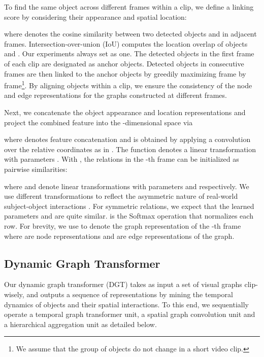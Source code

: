 \documentclass[runningheads]{llncs}
\begin{document}
To find the same object across different frames within a clip, we define a linking score  by considering their appearance and spatial location:

where  denotes the cosine similarity between two detected objects  and  in adjacent frames.  Intersection-over-union (IoU) computes the location overlap of objects  and . Our experiments always set   as one. The  detected objects in the first frame of each clip are designated as anchor objects. Detected objects in consecutive frames are then linked to the anchor objects by greedily maximizing  frame by frame\footnote{We assume that the group of objects do not change in a short video clip.}. By aligning objects within a clip, we ensure the consistency of the node and edge representations for the graphs constructed at different frames.

Next, we concatenate the object appearance  and location  representations and project the combined feature into the -dimensional space via

where  denotes feature concatenation and  is obtained by applying a  convolution over the relative coordinates as in \cite{xiao2021video}. The function  denotes a linear transformation with parameters . With , the relations in the -th frame can be initialized as 
pairwise similarities:

where  and  denote linear transformations with parameters  and  respectively. We use different transformations to reflect the asymmetric nature of real-world subject-object interactions \cite{krishna2018referring,xiao2020visual}. For symmetric relations, we expect that the learned parameters  and  are quite similar.  is the Softmax operation that normalizes each row. 
For brevity, we use  to denote the graph representation of the -th frame where  are node representations and  are edge representations of the graph.
\vspace{-0.3cm}

\subsection{Dynamic Graph Transformer}
Our dynamic graph transformer (DGT)  takes as input a set of visual graphs  clip-wisely, and outputs a sequence of representations  by mining the temporal dynamics of objects and their spatial interactions. To  this end, we sequentially operate    a temporal graph transformer unit, a spatial graph convolution unit and a hierarchical aggregation unit as detailed below.
\vspace{-0.3cm}
\end{document}
